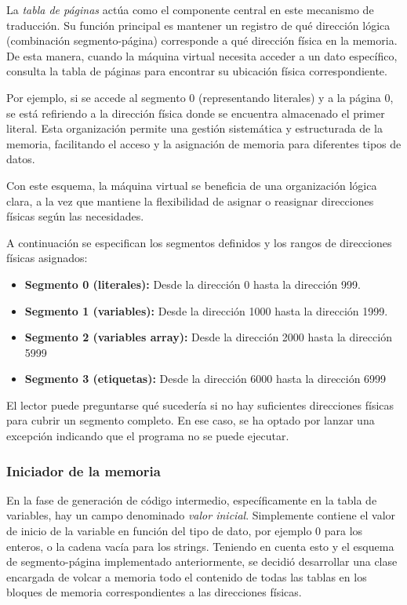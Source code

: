 \vspace{0.5cm}
La \textit{tabla de páginas} actúa como el componente central en este mecanismo de traducción. Su función principal es mantener un registro de qué dirección lógica (combinación segmento-página) corresponde a qué dirección física en la memoria. De esta manera, cuando la máquina virtual necesita acceder a un dato específico, consulta la tabla de páginas para encontrar su ubicación física correspondiente.

\vspace{0.5cm}
Por ejemplo, si se accede al segmento 0 (representando literales) y a la página 0, se está refiriendo a la dirección física donde se encuentra almacenado el primer literal. Esta organización permite una gestión sistemática y estructurada de la memoria, facilitando el acceso y la asignación de memoria para diferentes tipos de datos.

\vspace{0.5cm}
Con este esquema, la máquina virtual se beneficia de una organización lógica clara, a la vez que mantiene la flexibilidad de asignar o reasignar direcciones físicas según las necesidades.

\vspace{0.5cm}
A continuación se especifican los segmentos definidos y los rangos de direcciones físicas asignados:

\begin{itemize}
    \item \textbf{Segmento 0 (literales):} Desde la dirección 0 hasta la dirección 999.
    \item \textbf{Segmento 1 (variables):} Desde la dirección 1000 hasta la dirección 1999.
    \item \textbf{Segmento 2 (variables array):} Desde la dirección 2000 hasta la dirección 5999
    \item \textbf{Segmento 3 (etiquetas):} Desde la dirección 6000 hasta la dirección 6999
\end{itemize}

El lector puede preguntarse qué sucedería si no hay suficientes direcciones físicas para cubrir un segmento completo. En ese caso, se ha optado por lanzar una excepción indicando que el programa no se puede ejecutar.

\subsubsection{Iniciador de la memoria}
En la fase de generación de código intermedio, específicamente en la tabla de variables, hay un campo denominado \textit{valor inicial}. Simplemente contiene el valor de inicio de la variable en función del tipo de dato, por ejemplo 0 para los enteros, o la cadena vacía para los strings. Teniendo en cuenta esto y el esquema de segmento-página implementado anteriormente, se decidió desarrollar una clase encargada de volcar a memoria todo el contenido de todas las tablas en los bloques de memoria correspondientes a las direcciones físicas.

